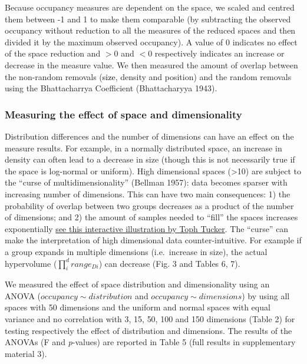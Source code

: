 \documentclass[]{article}
\begin{document}
\renewcommand\baselinestretch{1.6}\selectfont

Because occupancy measures are dependent on the space, we scaled and
centred them between -1 and 1 to make them comparable (by subtracting
the observed occupancy without reduction to all the measures of the
reduced spaces and then divided it by the maximum observed occupancy). A
value of 0 indicates no effect of the space reduction and \(>0\) and
\(<0\) respectively indicates an increase or decrease in the measure
value. We then measured the amount of overlap between the non-random
removals (\textcolor{black}{size}, density and
position) and the random removals using the Bhattacharrya Coefficient
(Bhattacharyya 1943).

\subsubsection{Measuring the effect of space and
dimensionality}\label{measuring-the-effect-of-space-and-dimensionality}

Distribution differences and the number of dimensions can have an effect
on the measure results. For example, in a normally distributed space, an
increase in density can often lead to a decrease in size (though this is
not necessarily true if the space is log-normal or uniform). High
dimensional spaces (\textgreater{}10) are subject to the ``curse of
multidimensionality'' (Bellman 1957): data becomes sparser with
increasing number of dimensions. This can have two main consequences: 1)
the probability of overlap between two groups decreases as a product of
the number of dimensions; and 2) the amount of samples needed to
``fill'' the spaces increases exponentially
\href{https://observablehq.com/@tophtucker/theres-plenty-of-room-in-the-corners}{see
this interactive illustration by Toph Tucker}. The ``curse'' can make
the interpretation of high dimensional data counter-intuitive. For
example if a group expands in multiple dimensions (i.e.~increase in
size), the actual hypervolume (\(\prod_{i}^{d} range_{Di}\)) can
decrease (Fig. 3 and Tables 6, 7).

We measured the effect of space distribution and dimensionality using an
ANOVA (\(occupancy \sim distribution\) and
\(occupancy \sim dimensions\)) by using all spaces with 50 dimensions
and the uniform and normal spaces with equal variance and no correlation
with 3, 15, 50, 100 and 150 dimensions (Table 2) for testing
respectively the effect of distribution and dimensions. The results of
the ANOVAs (F and \emph{p}-values) are reported in Table 5 (full results
in supplementary material 3).
\end{document}
